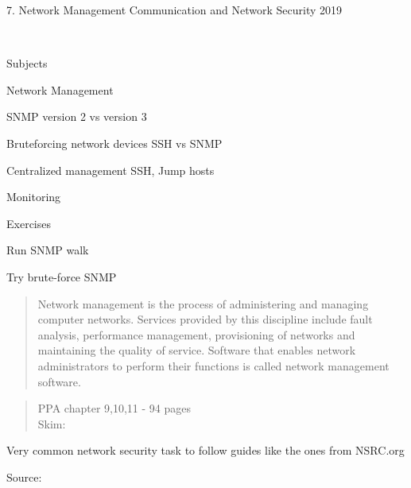 \documentclass[Screen16to9,17pt]{foils}
\begin{document}
\mytitlepage
{7. Network Management}
{Communication and Network Security 2019}



{~}

\begin{list1}
\item Subjects
\begin{list2}
\item Network Management
\item SNMP version 2 vs version 3
\item Bruteforcing network devices SSH vs SNMP
\item Centralized management SSH, Jump hosts
\item Monitoring
\end{list2}
\item Exercises
\begin{list2}
\item Run SNMP walk
\item Try brute-force SNMP
\end{list2}
\end{list1}



\begin{quote}
Network management is the process of administering and managing computer networks. Services provided by this discipline include fault analysis, performance management, provisioning of networks and maintaining the quality of service. Software that enables network administrators to perform their functions is called network management software.\\
\end{quote}

\begin{quote}
PPA chapter 9,10,11 - 94 pages\\
Skim:\\
\end{quote}

Very common network security task to follow guides like the ones from NSRC.org



Source:
\end{document}
